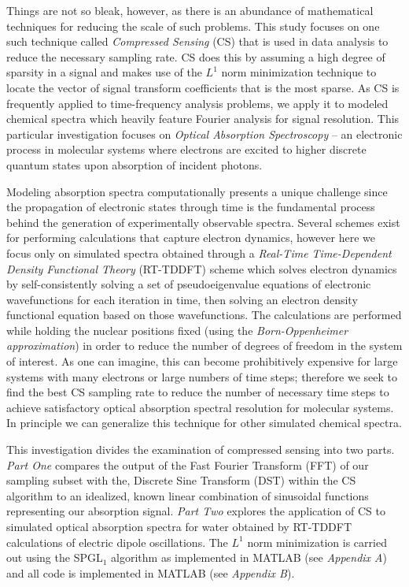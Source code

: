 \documentclass[11pt]{article}
\begin{document}
\par Things are not so bleak, however, as there is an abundance of mathematical techniques for reducing the scale of such problems. This study focuses on one such technique called \emph{Compressed Sensing} (CS) that is used in data analysis to reduce the necessary sampling rate. CS does this by assuming a high degree of sparsity in a signal and makes use of the $L^{1}$ norm minimization technique to locate the vector of signal transform coefficients that is the most sparse.  As CS is frequently applied to time-frequency analysis problems, we apply it to modeled chemical spectra which heavily feature Fourier analysis for signal resolution.  This particular investigation focuses on \emph{Optical Absorption Spectroscopy} -- an electronic process in molecular systems where electrons are excited to higher discrete quantum states upon absorption of incident photons. \\ 
 
\par Modeling absorption spectra computationally presents a unique challenge since the propagation of electronic states through time is the fundamental process behind the generation of experimentally observable spectra.  Several schemes exist for performing calculations that capture electron dynamics, however here we focus only on simulated spectra obtained through a \emph{Real-Time Time-Dependent Density Functional Theory} (RT-TDDFT) scheme which solves electron dynamics by self-consistently solving a set of pseudoeigenvalue equations of electronic wavefunctions for each iteration in time, then solving an electron density functional equation based on those wavefunctions.  The calculations are performed while holding the nuclear positions fixed (using the \emph{Born-Oppenheimer approximation}) in order to reduce the number of degrees of freedom in the system of interest.  As one can imagine, this can become prohibitively expensive for large systems with many electrons or large numbers of time steps; therefore we seek to find the best CS sampling rate to reduce the number of necessary time steps to achieve satisfactory optical absorption spectral resolution for molecular systems. In principle we can generalize this technique for other simulated chemical spectra.\\

\par This investigation divides the examination of compressed sensing into two parts.  \emph{Part One} compares the output of the Fast Fourier Transform (FFT) of our sampling subset with the, Discrete Sine Transform (DST) within the CS algorithm to an idealized, known linear combination of sinusoidal functions representing our absorption signal.  \emph{Part Two} explores the application of CS to simulated optical absorption spectra for water obtained by RT-TDDFT calculations of electric dipole oscillations.  The $L^{1}$ norm minimization is carried out using the SPGL$_{1}$  algorithm as implemented in MATLAB (see \emph{Appendix A}) and all code is implemented in MATLAB (see \emph{Appendix B}).
\end{document}
